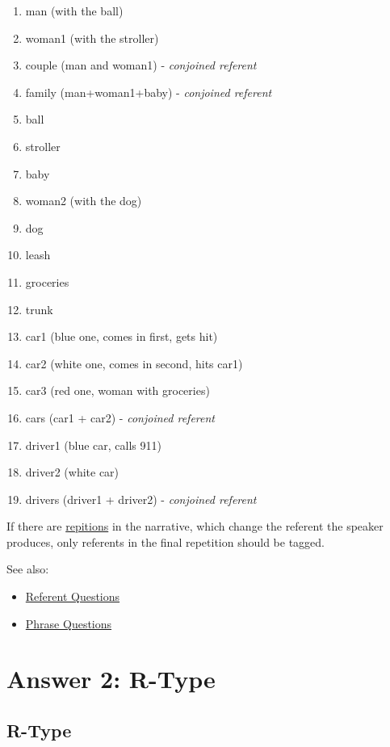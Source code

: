 \documentclass[
]{book}
\providecommand{\tightlist}{%
  \setlength{\itemsep}{0pt}\setlength{\parskip}{0pt}}
\begin{document}
\begin{enumerate}
\def\labelenumi{\arabic{enumi}.}
\tightlist
\item
  man (with the ball)
\item
  woman1 (with the stroller)
\item
  couple (man and woman1) - \emph{conjoined referent}
\item
  family (man+woman1+baby) - \emph{conjoined referent}
\item
  ball
\item
  stroller
\item
  baby
\item
  woman2 (with the dog)
\item
  dog
\item
  leash
\item
  groceries
\item
  trunk
\item
  car1 (blue one, comes in first, gets hit)
\item
  car2 (white one, comes in second, hits car1)
\item
  car3 (red one, woman with groceries)
\item
  cars (car1 + car2) - \emph{conjoined referent}
\item
  driver1 (blue car, calls 911)
\item
  driver2 (white car)
\item
  drivers (driver1 + driver2) - \emph{conjoined referent}
\end{enumerate}

If there are \protect\hyperlink{identifying-repitions}{repitions} in the narrative,
which change the referent the speaker produces,
only referents in the final repetition should be tagged.

See also:

\begin{itemize}
\tightlist
\item
  \protect\hyperlink{referents-1}{Referent Questions}
\item
  \protect\hyperlink{phrases}{Phrase Questions}
\end{itemize}

\hypertarget{answer-2-r-type}{%
\chapter{Answer 2: R-Type}\label{answer-2-r-type}}

\hypertarget{r-type}{%
\section{R-Type}\label{r-type}}
\end{document}
